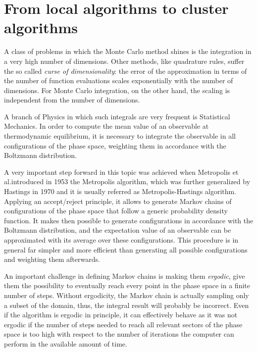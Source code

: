 \section*{From local algorithms to cluster algorithms}
A class of problems in which the Monte Carlo method shines is the integration in a very high number of dimensions.
Other methods, like quadrature rules, suffer the so called \emph{curse of dimensionality}:
the error of the approximation in terms of the number of function evaluations scales exponentially with the number of dimensions.
For Monte Carlo integration, on the other hand, the scaling is independent from the number of dimensions.

A branch of Physics in which such integrals are very frequent is Statistical Mechanics.
In order to compute the mean value of an observable at thermodynamic equilibrium,
it is necessary to integrate the observable in all configurations of the phase space, weighting them in accordance with the Boltzmann distribution.

A very important step forward in this topic was achieved when Metropolis et al.\@ introduced in 1953 \cite{metropolis:1953} the Metropolis algorithm,
which was further generalized by Hastings in 1970 \cite{hastings:1970} and it is usually referred as Metropolis-Hastings algorithm.
Applying an accept/reject principle, it allows to generate Markov chains of configurations of the phase space that follow a generic probability density function.
It makes then possible to generate configurations in accordance with the Boltzmann distribution,
and the expectation value of an observable can be approximated with its average over these configurations.
This procedure is in general far simpler and more efficient than generating all possible configurations and weighting them afterwards.

An important challenge in defining Markov chains is making them \emph{ergodic},
\ie give them the possibility to eventually reach every point in the phase space in a finite number of steps.
Without ergodicity, the Markov chain is actually sampling only a subset of the domain, thus, the integral result will probably be incorrect.
Even if the algorithm is ergodic in principle,
it can effectively behave as it was not ergodic if the number of steps needed to reach all relevant sectors of the phase space is too high
with respect to the number of iterations the computer can perform in the available amount of time.

